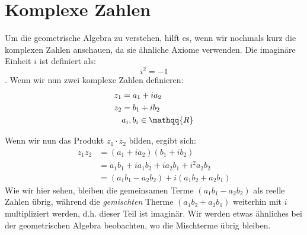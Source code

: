 %
%
%
%
\section{Komplexe Zahlen
\label{geoalgebra:section:complex-numbers}}
Um die geometrische Algebra zu verstehen, hilft es, wenn wir nochmals kurz die komplexen Zahlen anschauen, da sie ähnliche Axiome verwenden.
Die imaginäre Einheit $i$ ist definiert als:
\begin{equation}
  i^2 = -1
\end{equation}.
Wenn wir nun zwei komplexe Zahlen definieren:
\begin{align*}
  z_1 &= a_1 + i a_2 \\
  z_2 &= b_1 + i b_2 \\ 
  &a_i, b_i \in \mathqq{R}
\end{align*}

Wenn wir nun das Produkt $z_1 \cdot{} z_2$ bilden, ergibt sich:
\begin{align*}
  z_1 z_2 &= (a_1 + i a_2) (b_1 + i b_2) \\
  &= a_1 b_1 + i a_1 b_2 + i a_2 b_1 + i^2 a_2 b_2 \\
  &= (a_1 b_1 - a_2 b_2) + i (a_1 b_2 + a_2 b_1)
\end{align*}
Wie wir hier sehen, bleiben die gemeinsamen Terme $(a_1 b_1 - a_2 b_2)$ als reelle Zahlen übrig, während die \emph{gemischten} Therme $(a_1 b_2 + a_2 b_1)$ weiterhin mit $i$
multipliziert werden, d.h. dieser Teil ist imaginär. Wir werden etwas ähnliches bei der geometrischen Algebra beobachten, wo die Mischterme übrig bleiben.




